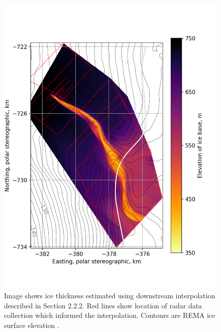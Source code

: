 \begin{figure}[!ht]
\centering
\includegraphics[width=1.1\textwidth]{chapters/2/thickness_solo.png}
\caption[Radargram]{Image shows ice thickness estimated using downstream interpolation described in Section 2.2.2. Red lines show location of radar data collection which informed the interpolation. Contours are REMA ice surface elevation \cite{howat2019reference}.}
\end{figure}


